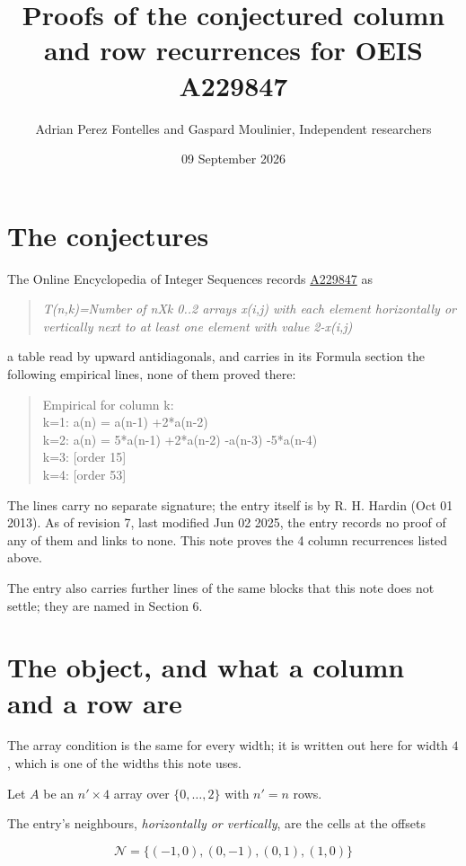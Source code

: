 \documentclass[11pt]{article}
\title{Proofs of the conjectured column and row recurrences for OEIS A229847}
\author{Adrian Perez Fontelles and Gaspard Moulinier, Independent researchers}
\date{09 September 2026}
\theoremstyle{definition}
\begin{document}
\maketitle
\section{The conjectures}

The Online Encyclopedia of Integer Sequences records \href{https://oeis.org/A229847}{A229847} as

\begin{quote}\itshape T(n,k)=Number of nXk 0..2 arrays x(i,j) with each element horizontally or vertically next to at least one element with value 2-x(i,j)\end{quote}

a table read by upward antidiagonals, and carries in its Formula section the following empirical lines, none of them proved there:

\begin{quote}\ttfamily Empirical for column k:\\
k=1: a(n) = a(n-1) +2*a(n-2)\\k=2: a(n) = 5*a(n-1) +2*a(n-2) -a(n-3) -5*a(n-4)\\k=3: [order 15]\\k=4: [order 53]\end{quote}

The lines carry no separate signature; the entry itself is by R. H. Hardin (Oct 01 2013). As of revision 7, last modified Jun 02 2025, the entry records no proof of any of them and links to none. This note proves the 4 column recurrences listed above.

The entry also carries further lines of the same blocks that this note does not settle; they are named in Section 6.

\section{The object, and what a column and a row are}

The array condition is the same for every width; it is written out here for width $4$, which is one of the widths this note uses.

Let $A$ be an $n' \times 4$ array over $\{0,\dots,2\}$ with $n' = n$ rows.

The entry's neighbours, {\itshape horizontally or vertically}, are the cells at the offsets

\[\mathcal{N} = \{(-1,0), (0,-1), (0,1), (1,0)\}\]
\end{document}
